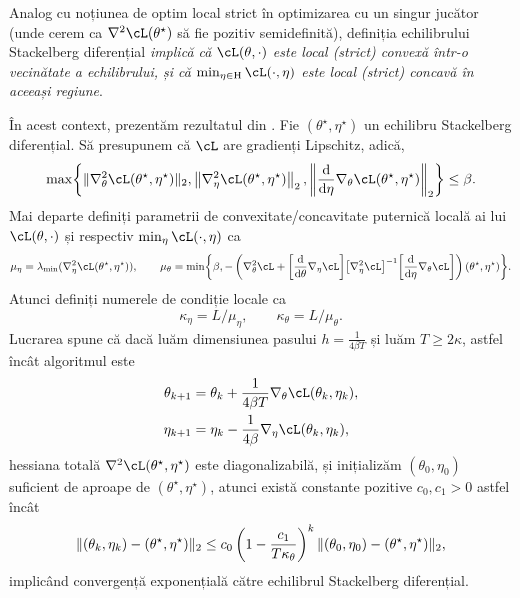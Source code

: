 \documentclass[../../book-main_ro.tex]{subfiles}
\begin{document}
Analog cu noțiunea de optim local strict în optimizarea cu un singur jucător (unde cerem ca \(\nabla^{2}\cL(\theta^{\star})\) să fie pozitiv semidefinită), definiția echilibrului Stackelberg diferențial \textit{implică că \(\cL(\theta, \cdot)\) este local (strict) convexă într-o vecinătate a echilibrului, și că \(\min_{\eta \in \Eta}\cL(\cdot, \eta)\) este local (strict) concavă în aceeași regiune}.

În acest context, prezentăm rezultatul din \cite{li2022convergence}. Fie \((\theta^{\star}, \eta^{\star})\) un echilibru Stackelberg diferențial. Să presupunem că \(\cL\) are gradienți Lipschitz, adică,
\begin{equation}
    \max\rc{\norm{\nabla_{\theta}^{2}\cL(\theta^{\star}, \eta^{\star})}_{2}, \norm*{\nabla_{\eta}^{2}\cL(\theta^{\star}, \eta^{\star})}_{2},  \norm*{\odv*{\nabla_{\theta}\cL(\theta^{\star}, \eta^{\star})}{\eta}}_{2}} \leq \beta.
\end{equation}
Mai departe definiți parametrii de convexitate/concavitate puternică locală ai lui \(\cL(\theta, \cdot)\) și respectiv \(\min_{\eta}\cL(\cdot, \eta)\) ca
\begin{equation}
    \mu_{\eta} = \lambda_{\min}(\nabla_{\eta}^{2}\cL(\theta^{\star}, \eta^{\star})), \qquad \mu_{\theta} = \min\rc{\beta, -\bp{\nabla_{\theta}^{2}\cL + \rs{\odv*{\nabla_{\eta}\cL}{\theta}}\rs{\nabla_{\eta}^{2}\cL}^{-1}\rs{\odv*{\nabla_{\theta}\cL}{\eta}}}(\theta^{\star}, \eta^{\star})}.
\end{equation}
Atunci definiți numerele de condiție locale ca 
\begin{equation}
    \kappa_{\eta} = L/\mu_{\eta}, \qquad \kappa_{\theta} = L/\mu_{\theta}.
\end{equation}
Lucrarea \cite{li2022convergence} spune că dacă luăm dimensiunea pasului \(h = \frac{1}{4\beta T}\) și luăm \(T \geq 2\kappa\), astfel încât algoritmul este 
\begin{align}
    \theta_{k + 1}
    &= \theta_{k} + \frac{1}{4\beta T}\nabla_{\theta} \cL(\theta_{k}, \eta_{k}), \\
    \eta_{k + 1}
    &= \eta_{k} - \frac{1}{4\beta}\nabla_{\eta} \cL(\theta_{k}, \eta_{k}),
\end{align}
hessiana totală \(\nabla^{2}\cL(\theta^{\star}, \eta^{\star})\) este diagonalizabilă, și inițializăm \((\theta_{0}, \eta_{0})\) suficient de aproape de \((\theta^{\star}, \eta^{\star})\), atunci există constante pozitive \(c_{0}, c_{1} > 0\) astfel încât 
\begin{equation}
    \norm{(\theta_{k}, \eta_{k}) - (\theta^{\star}, \eta^{\star})}_{2} \leq c_{0}\bp{1 - \frac{c_{1}}{T\kappa_{\theta}}}^{k}\norm{(\theta_{0}, \eta_{0}) - (\theta^{\star}, \eta^{\star})}_{2},
\end{equation}
implicând convergență exponențială către echilibrul Stackelberg diferențial.
\end{document}
